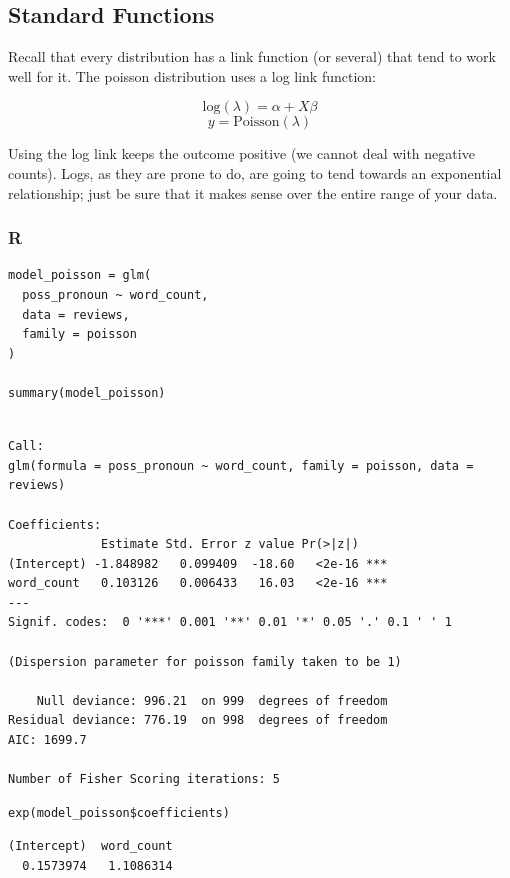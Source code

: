 \documentclass[
  letterpaper,
]{krantz}
\begin{document}
\subsection{Standard Functions}\label{sec-glm-poisson-standard}

Recall that every distribution has a link function (or several) that
tend to work well for it. The poisson distribution uses a log link
function:

\[\text{log}(\lambda) = \alpha + X\beta\]
\[y = \textrm{Poisson}(\lambda)\]

Using the log link keeps the outcome positive (we cannot deal with
negative counts). Logs, as they are prone to do, are going to tend
towards an exponential relationship; just be sure that it makes sense
over the entire range of your data.

\subsubsection{R}

\begin{verbatim}
model_poisson = glm(
  poss_pronoun ~ word_count,
  data = reviews,
  family = poisson
)

summary(model_poisson)
\end{verbatim}

\begin{verbatim}

Call:
glm(formula = poss_pronoun ~ word_count, family = poisson, data = reviews)

Coefficients:
             Estimate Std. Error z value Pr(>|z|)    
(Intercept) -1.848982   0.099409  -18.60   <2e-16 ***
word_count   0.103126   0.006433   16.03   <2e-16 ***
---
Signif. codes:  0 '***' 0.001 '**' 0.01 '*' 0.05 '.' 0.1 ' ' 1

(Dispersion parameter for poisson family taken to be 1)

    Null deviance: 996.21  on 999  degrees of freedom
Residual deviance: 776.19  on 998  degrees of freedom
AIC: 1699.7

Number of Fisher Scoring iterations: 5
\end{verbatim}

\begin{verbatim}
exp(model_poisson$coefficients)
\end{verbatim}

\begin{verbatim}
(Intercept)  word_count 
  0.1573974   1.1086314 
\end{verbatim}
\end{document}
